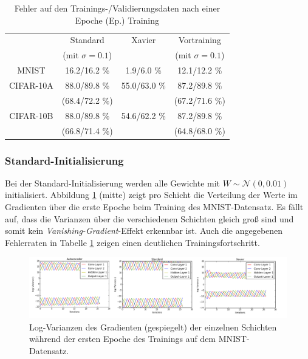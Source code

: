 \begin{table}[H]

\centering
\begin{tabular}{c|c|c|c}
 	 			&   Standard		&  Xavier  	 	&  Vortraining 	 	\\ 
 	 			&     (mit $\sigma = 0.1$)		&  $~$  	 	&   (mit $\sigma = 0.1$)	 	\\ 
\hline MNIST 	&  	16.2/16.2 \%	&  	1.9/6.0   \% &  12.1/12.2 \%									\\
\hline CIFAR-10A&  	88.0/89.8 \%   &  	55.0/63.0 \% &  87.2/89.8 \%  				\\  
				&  	(68.4/72.2 \%)  &  	$~$ 		 &  (67.2/71.6 \%) 				\\  
\hline CIFAR-10B&  	88.0/89.8 \%	&  	54.6/62.2 \% &  87.2/89.8 \%		\\  
				&  	(66.8/71.4 \%)  &  	$~$ 		 &  (64.8/68.0 \%) 				\\  
\end{tabular} 
\caption{Fehler auf den Trainings-/Validierungsdaten nach einer Epoche (Ep.) Training}
\label{tab:6_initialisierung}
\end{table}

\subsubsection{Standard-Initialisierung}
Bei der Standard-Initialisierung werden alle Gewichte mit $W \sim \mathcal{N} (0,0.01)$ ini\-tialisiert. Abbildung \ref{fig:6_xavier_initialization} (mitte) zeigt pro Schicht die Verteilung der Werte im Gradienten über die erste Epoche beim Training des MNIST-Datensatz. Es fällt auf, dass die Varianzen über die verschiedenen Schichten gleich groß sind und somit kein \textit{Vanishing-Gradient}-Effekt erkennbar ist. Auch die angegebenen Fehlerraten in Tabelle \ref{tab:6_initialisierung} zeigen einen deutlichen Trainingsfortschritt.

\begin{figure}[H]
\centering
\includegraphics[width=1.0\linewidth]{images/6_xavier_initialization}
\caption[]{Log-Varianzen des Gradienten (gespiegelt) der einzelnen Schichten während der ersten Epoche des Trainings auf dem MNIST-Datensatz.}
\label{fig:6_xavier_initialization}
\end{figure}

